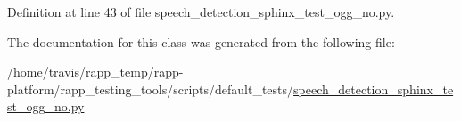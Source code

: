Definition at line 43 of file speech\-\_\-detection\-\_\-sphinx\-\_\-test\-\_\-ogg\-\_\-no.\-py.



The documentation for this class was generated from the following file\-:\begin{DoxyCompactItemize}
\item 
/home/travis/rapp\-\_\-temp/rapp-\/platform/rapp\-\_\-testing\-\_\-tools/scripts/default\-\_\-tests/\hyperlink{speech__detection__sphinx__test__ogg__no_8py}{speech\-\_\-detection\-\_\-sphinx\-\_\-test\-\_\-ogg\-\_\-no.\-py}\end{DoxyCompactItemize}
